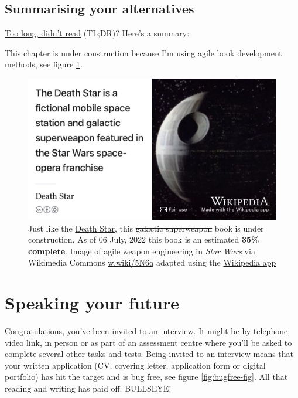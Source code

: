 \documentclass[
]{book}
\begin{document}
\hypertarget{tldr11}{%
\section{Summarising your alternatives}\label{tldr11}}

\href{https://en.wiktionary.org/wiki/too_long;_didn\%27t_read}{Too long, didn't read} (TL;DR)? Here's a summary:

This chapter is under construction because I'm using agile book development methods, see figure \ref{fig:deathstar8-fig}.

\begin{figure}

{\centering \includegraphics[width=0.99\linewidth]{images/DeathStar2} 

}

\caption{Just like the \href{https://en.wikipedia.org/wiki/Death_Star}{Death Star}, this \sout{galactic superweapon} book is under construction. As of 06 July, 2022 this book is an estimated \textbf{35\% complete}. Image of agile weapon engineering in \emph{Star Wars} via Wikimedia Commons \href{https://w.wiki/5N6q}{w.wiki/5N6q} adapted using the \href{https://apps.apple.com/gb/app/wikipedia/id324715238}{Wikipedia app}}\label{fig:deathstar8-fig}
\end{figure}

\hypertarget{speaking}{%
\chapter{Speaking your future}\label{speaking}}

Congratulations, you've been invited to an interview. It might be by telephone, video link, in person or as part of an assessment centre where you'll be asked to complete several other tasks and tests. Being invited to an interview means that your written application (CV, covering letter, application form or digital portfolio) has hit the target and is bug free, see figure \ref{fig:bugfree-fig}. All that reading and writing has paid off. BULLSEYE! 🎯
\end{document}
